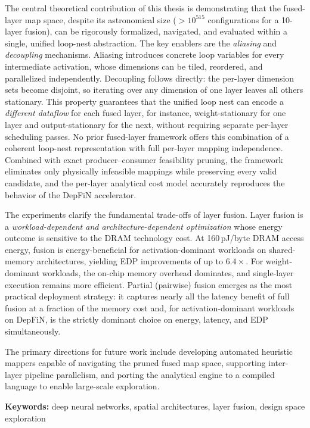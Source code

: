 \documentclass[11pt,a4paper,twocolumn]{article}
\begin{document}
The central theoretical contribution of this thesis is demonstrating
that the fused-layer map space, despite its astronomical size
($>10^{515}$ configurations for a 10-layer fusion), can be rigorously
formalized, navigated, and evaluated within a single, unified loop-nest
abstraction.
The key enablers are the \emph{aliasing} and \emph{decoupling}
mechanisms.
Aliasing introduces concrete loop variables for every intermediate
activation, whose dimensions can be tiled, reordered, and
parallelized independently.
Decoupling follows directly: the per-layer dimension
sets become disjoint,
so iterating over any dimension of one layer
leaves all others stationary.
This property guarantees that the unified loop nest can encode a
\emph{different dataflow} for each fused layer, for instance,
weight-stationary for one layer and output-stationary for the
next, without requiring separate per-layer scheduling passes.
No prior fused-layer framework offers this combination of a coherent
loop-nest representation with full per-layer mapping independence.
Combined with exact producer--consumer feasibility pruning, the
framework eliminates only physically infeasible mappings while
preserving every valid candidate, and the per-layer analytical cost
model accurately reproduces the behavior of the DepFiN accelerator.

The experiments clarify the fundamental trade-offs of layer fusion.
Layer fusion is a \emph{workload-dependent and
architecture-dependent optimization} whose energy outcome is
sensitive to the DRAM technology cost.
At 160\,pJ/byte DRAM access energy, fusion is energy-beneficial for
activation-dominant workloads on shared-memory architectures,
yielding EDP improvements of up to $6.4\times$.
For weight-dominant workloads, the on-chip memory overhead dominates,
and single-layer execution remains more efficient.
Partial (pairwise) fusion emerges as the most practical deployment
strategy: it captures nearly all the latency benefit of full fusion
at a fraction of the memory cost and, for activation-dominant
workloads on DepFiN, is the strictly dominant choice on energy,
latency, and EDP simultaneously.

The primary directions for future work include developing automated
heuristic mappers capable of navigating the pruned fused map space,
supporting inter-layer pipeline parallelism, and porting the
analytical engine to a compiled language to enable large-scale
exploration.


\vspace{1em}
\noindent\textbf{Keywords:} deep neural networks, spatial architectures,
layer fusion, design space exploration

\end{document}

